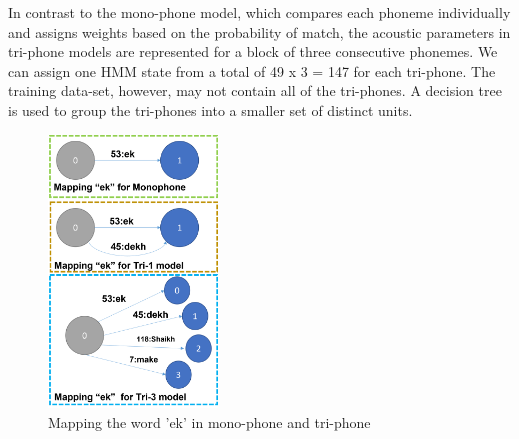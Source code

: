 In contrast to the mono-phone model, which compares each phoneme individually and assigns weights based on the probability of match, the acoustic parameters in tri-phone models are represented for a block of three consecutive phonemes. We can assign one HMM state from a total of 49 x 3 = 147  for each tri-phone. The training data-set, however, may not contain all of the tri-phones. A decision tree is used to group the tri-phones into a smaller set of distinct units.

\begin{figure}[h]
    \centering
    \includegraphics[width=0.4\textwidth]{img/mapping.png}
    \caption{Mapping the word 'ek' in mono-phone and tri-phone}
    \label{fig:mapping-mono-tri}
\end{figure}

